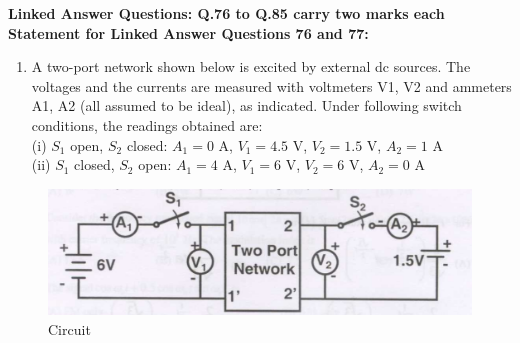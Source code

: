 \documentclass[12pt]{article}
\begin{document}
 \large \textbf {Linked Answer Questions: Q.76 to Q.85 carry two marks each}
 \large \textbf {Statement for Linked Answer Questions 76 and 77: }

\begin{enumerate}
\item A two-port network shown below is excited by external dc sources. The voltages and the currents are measured with voltmeters V1, V2 and ammeters A1, A2 (all assumed to be ideal), as indicated. Under following switch conditions, the readings obtained are: \\
(i) $S_1$ open, $S_2$ closed: $A_1=0$ A, $V_1=4.5$ V, $V_2=1.5$ V, $A_2=1$ A \\
(ii) $S_1$ closed, $S_2$ open: $A_1=4$ A, $V_1=6$ V, $V_2=6$ V, $A_2=0$ A
\end{enumerate}
\begin{figure}[H]\centering
\includegraphics[width=0.6\columnwidth]{figs/q7677.png}
\caption{Circuit}
\label{fig:q7677}
\end{figure}
\end{document}
